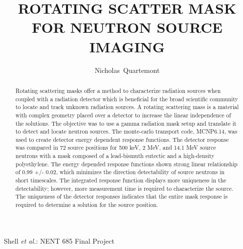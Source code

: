 \documentclass[journal]{IEEEtran}
\begin{document}
	\title{ROTATING SCATTER MASK FOR NEUTRON SOURCE IMAGING}
	
	\author{Nicholas~Quartemont}
	
	{Shell \MakeLowercase{\textit{et al.}}: NENT 685 Final Project}
	
	\maketitle
	
	\begin{abstract}
		Rotating scattering masks offer a method to characterize radiation sources when coupled with a radiation detector which is beneficial for the broad scientific community to locate and track unknown radiation sources.  A rotating scattering mass is a material with complex geometry placed over a detector to increase the linear independence of the solutions.  The objective was to use a gamma radiation mask setup and translate it to detect and locate neutron sources.  The monte-carlo transport code, MCNP6.14, was used to create detector energy dependent response functions.  The detector response was compared in 72 source positions for 500 keV, 2 MeV, and 14.1 MeV source neutrons with a mask composed of a lead-bismuth eutectic and a high-density polyethylene.  The energy depended response functions shown strong linear relationship of 0.99 +/- 0.02, which minimizes the direction detectability of source neutrons in short timescales. The integrated response function displays more uniqueness in the detectability; however, more measurement time is required to characterize the source.  The uniqueness of the detector responses indicates that the entire mask response is required to determine a solution for the source position. 
	\end{abstract}
	
\end{document}

